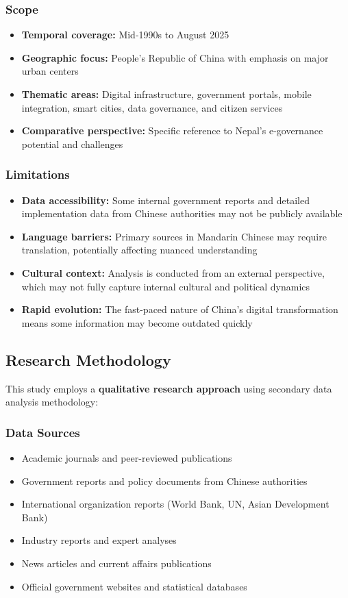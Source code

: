 \documentclass[12pt,a4paper]{article}
\begin{document}
\subsubsection{Scope}
\begin{itemize}
    \item \textbf{Temporal coverage:} Mid-1990s to August 2025
    \item \textbf{Geographic focus:} People's Republic of China with emphasis on major urban centers
    \item \textbf{Thematic areas:} Digital infrastructure, government portals, mobile integration, smart cities, data governance, and citizen services
    \item \textbf{Comparative perspective:} Specific reference to Nepal's e-governance potential and challenges
\end{itemize}

\subsubsection{Limitations}
\begin{itemize}
    \item \textbf{Data accessibility:} Some internal government reports and detailed implementation data from Chinese authorities may not be publicly available
    \item \textbf{Language barriers:} Primary sources in Mandarin Chinese may require translation, potentially affecting nuanced understanding
    \item \textbf{Cultural context:} Analysis is conducted from an external perspective, which may not fully capture internal cultural and political dynamics
    \item \textbf{Rapid evolution:} The fast-paced nature of China's digital transformation means some information may become outdated quickly
\end{itemize}

\subsection{Research Methodology}

This study employs a \textbf{qualitative research approach} using secondary data analysis methodology:

\subsubsection{Data Sources}
\begin{itemize}
    \item Academic journals and peer-reviewed publications
    \item Government reports and policy documents from Chinese authorities
    \item International organization reports (World Bank, UN, Asian Development Bank)
    \item Industry reports and expert analyses
    \item News articles and current affairs publications
    \item Official government websites and statistical databases
\end{itemize}
\end{document}
